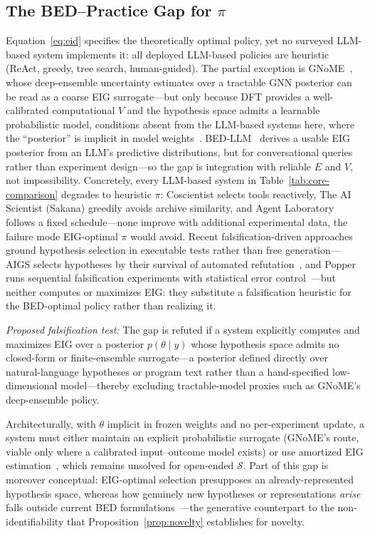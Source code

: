 \documentclass{article}
\begin{document}
\subsection{The BED--Practice Gap for $\pi$}

Equation~\ref{eq:eid} specifies the theoretically optimal policy, yet no surveyed LLM-based system implements it: all deployed LLM-based policies are heuristic (ReAct, greedy, tree search, human-guided). The partial exception is GNoME~\citep{merchant2023gnome}, whose deep-ensemble uncertainty estimates over a tractable GNN posterior can be read as a coarse EIG surrogate---but only because DFT provides a well-calibrated computational $V$ and the hypothesis space admits a learnable probabilistic model, conditions absent from the LLM-based systems here, where the ``posterior'' is implicit in model weights~\citep{foster2021dad}. BED-LLM~\citep{choudhury2026bedllm} derives a usable EIG posterior from an LLM's predictive distributions, but for conversational queries rather than experiment design---so the gap is integration with reliable $E$ and $V$, not impossibility. Concretely, every LLM-based system in Table~\ref{tab:core-comparison} degrades to heuristic $\pi$: Coscientist selects tools reactively, The AI Scientist (Sakana) greedily avoids archive similarity, and Agent Laboratory follows a fixed schedule---none improve with additional experimental data, the failure mode EIG-optimal $\pi$ would avoid. Recent falsification-driven approaches ground hypothesis selection in executable tests rather than free generation---AIGS selects hypotheses by their survival of automated refutation~\citep{liu2024aigs}, and Popper runs sequential falsification experiments with statistical error control~\citep{huang2025popper}---but neither computes or maximizes EIG: they substitute a falsification heuristic for the BED-optimal policy rather than realizing it.

\textit{Proposed falsification test:} The gap is refuted if a system explicitly computes and maximizes EIG over a posterior $p(\theta \mid y)$ whose hypothesis space admits no closed-form or finite-ensemble surrogate---a posterior defined directly over natural-language hypotheses or program text rather than a hand-specified low-dimensional model---thereby excluding tractable-model proxies such as GNoME's deep-ensemble policy.

Architecturally, with $\theta$ implicit in frozen weights and no per-experiment update, a system must either maintain an explicit probabilistic surrogate (GNoME's route, viable only where a calibrated input--outcome model exists) or use amortized EIG estimation~\citep{foster2021dad}, which remains unsolved for open-ended $\mathcal{S}$. Part of this gap is moreover conceptual: EIG-optimal selection presupposes an already-represented hypothesis space, whereas how genuinely new hypotheses or representations \emph{arise} falls outside current BED formulations~\citep{yanai2019night}---the generative counterpart to the non-identifiability that Proposition~\ref{prop:novelty} establishes for novelty.
\end{document}
